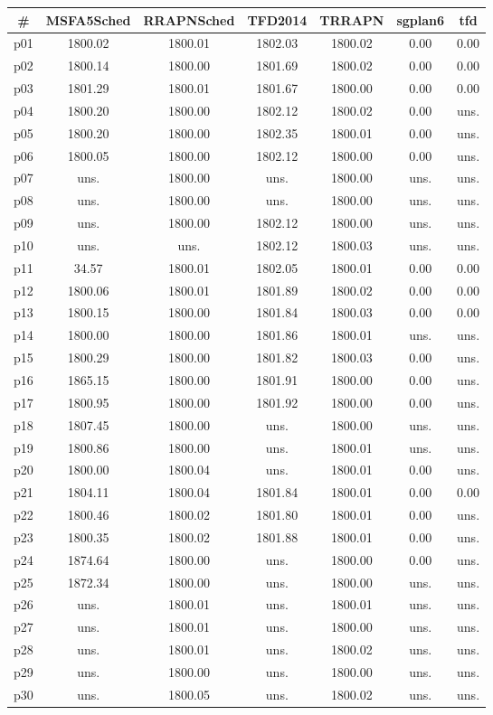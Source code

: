\begin{tabular}{ccccccc}
\toprule
\textbf{\#} & \textbf{MSFA5Sched} & \textbf{RRAPNSched} & \textbf{TFD2014} & \textbf{TRRAPN} & \textbf{sgplan6} & \textbf{tfd}\\
\midrule
p01 & 1800.02 & 1800.01 & 1802.03 & 1800.02 & 0.00 & 0.00\\
p02 & 1800.14 & 1800.00 & 1801.69 & 1800.02 & 0.00 & 0.00\\
p03 & 1801.29 & 1800.01 & 1801.67 & 1800.00 & 0.00 & 0.00\\
p04 & 1800.20 & 1800.00 & 1802.12 & 1800.02 & 0.00 & uns.\\
p05 & 1800.20 & 1800.00 & 1802.35 & 1800.01 & 0.00 & uns.\\
p06 & 1800.05 & 1800.00 & 1802.12 & 1800.00 & 0.00 & uns.\\
p07 & uns. & 1800.00 & uns. & 1800.00 & uns. & uns.\\
p08 & uns. & 1800.00 & uns. & 1800.00 & uns. & uns.\\
p09 & uns. & 1800.00 & 1802.12 & 1800.00 & uns. & uns.\\
p10 & uns. & uns. & 1802.12 & 1800.03 & uns. & uns.\\
p11 & 34.57 & 1800.01 & 1802.05 & 1800.01 & 0.00 & 0.00\\
p12 & 1800.06 & 1800.01 & 1801.89 & 1800.02 & 0.00 & 0.00\\
p13 & 1800.15 & 1800.00 & 1801.84 & 1800.03 & 0.00 & 0.00\\
p14 & 1800.00 & 1800.00 & 1801.86 & 1800.01 & uns. & uns.\\
p15 & 1800.29 & 1800.00 & 1801.82 & 1800.03 & 0.00 & uns.\\
p16 & 1865.15 & 1800.00 & 1801.91 & 1800.00 & 0.00 & uns.\\
p17 & 1800.95 & 1800.00 & 1801.92 & 1800.00 & 0.00 & uns.\\
p18 & 1807.45 & 1800.00 & uns. & 1800.00 & uns. & uns.\\
p19 & 1800.86 & 1800.00 & uns. & 1800.01 & uns. & uns.\\
p20 & 1800.00 & 1800.04 & uns. & 1800.01 & 0.00 & uns.\\
p21 & 1804.11 & 1800.04 & 1801.84 & 1800.01 & 0.00 & 0.00\\
p22 & 1800.46 & 1800.02 & 1801.80 & 1800.01 & 0.00 & uns.\\
p23 & 1800.35 & 1800.02 & 1801.88 & 1800.01 & 0.00 & uns.\\
p24 & 1874.64 & 1800.00 & uns. & 1800.00 & 0.00 & uns.\\
p25 & 1872.34 & 1800.00 & uns. & 1800.00 & uns. & uns.\\
p26 & uns. & 1800.01 & uns. & 1800.01 & uns. & uns.\\
p27 & uns. & 1800.01 & uns. & 1800.00 & uns. & uns.\\
p28 & uns. & 1800.01 & uns. & 1800.02 & uns. & uns.\\
p29 & uns. & 1800.00 & uns. & 1800.00 & uns. & uns.\\
p30 & uns. & 1800.05 & uns. & 1800.02 & uns. & uns.\\
\bottomrule
\end{tabular}

